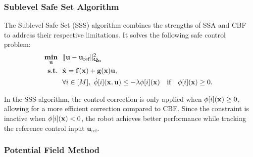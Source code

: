 \subsubsection{Sublevel Safe Set Algorithm}

The Sublevel Safe Set (SSS) algorithm \cite{wei2019safe} combines the strengths of SSA and CBF to address their respective limitations. It solves the following safe control problem:  
\begin{align}\label{eq:safe_control_problem_sss}
    \mathop{\mathbf{min}}_{\mathbf{u}}~~ & \|\mathbf{u} - \mathbf{u}_{\text{ref}} \|^2_{\mathbf{Q}_\mathbf{u}} \\ \nonumber
    \mathop{\mathbf{s.t.}}~~ & \dot{\mathbf{x}} = \mathbf{f}(\mathbf{x}) + \mathbf{g}(\mathbf{x})\mathbf{u}, \\ \nonumber
    & \forall i \in [M],~ \dot{\phi}[i](\mathbf{x}, \mathbf{u}) \leq -\lambda \phi[i](\mathbf{x}) \quad \text{if} \quad \phi[i](\mathbf{x}) \geq 0.
\end{align}  

In the SSS algorithm, the control correction is only applied when $\phi[i](\mathbf{x}) \geq 0$, allowing for a more efficient correction compared to CBF. Since the constraint is inactive when $\phi[i](\mathbf{x}) < 0$, the robot achieves better performance while tracking the reference control input $\mathbf{u}_{\text{ref}}$.  

\subsubsection{Potential Field Method}

